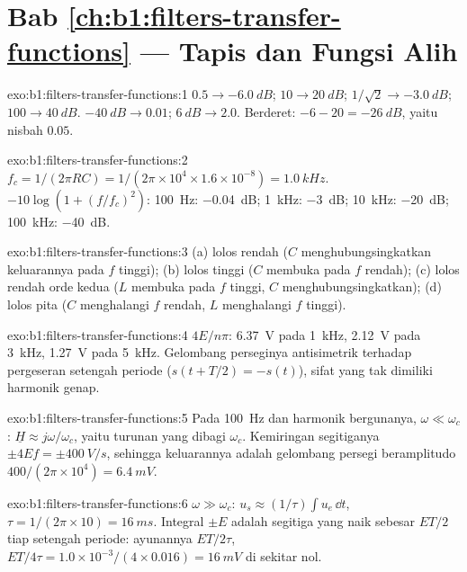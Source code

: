 \section*{Bab \ref{ch:b1:filters-transfer-functions} --- Tapis dan Fungsi Alih}

\begin{solution}{exo:b1:filters-transfer-functions:1}
$0.5 \to \qty{-6.0}{dB}$; $10 \to \qty{20}{dB}$; $1/\sqrt2 \to \qty{-3.0}{dB}$;
$100 \to \qty{40}{dB}$. $\qty{-40}{dB} \to 0.01$; $\qty{+6}{dB} \to 2.0$.
Berderet: $-6 - 20 = \qty{-26}{dB}$, yaitu nisbah $0.05$.
\end{solution}

\begin{solution}{exo:b1:filters-transfer-functions:2}
$f_c = 1/(2\pi RC) = 1/(2\pi \times 10^4 \times 1.6\times10^{-8}) =
\qty{1.0}{kHz}$.  $-10\log(1 + (f/f_c)^2)$: \qty{100}{Hz}:
\qty{-0.04}{dB}; \qty{1}{kHz}: \qty{-3}{dB}; \qty{10}{kHz}: \qty{-20}{dB};
\qty{100}{kHz}: \qty{-40}{dB}.
\end{solution}

\begin{solution}{exo:b1:filters-transfer-functions:3}
(a) lolos rendah ($C$ menghubungsingkatkan keluarannya pada $f$ tinggi);
(b) lolos tinggi ($C$ membuka pada $f$ rendah); (c) lolos rendah orde
kedua ($L$ membuka pada $f$ tinggi, $C$ menghubungsingkatkan); (d) lolos
pita ($C$ menghalangi $f$ rendah, $L$ menghalangi $f$ tinggi).
\end{solution}

\begin{solution}{exo:b1:filters-transfer-functions:4}
$4E/n\pi$: \qty{6.37}{V} pada \qty{1}{kHz}, \qty{2.12}{V} pada \qty{3}{kHz},
\qty{1.27}{V} pada \qty{5}{kHz}. Gelombang perseginya antisimetrik
terhadap pergeseran setengah periode ($s(t + T/2) = -s(t)$), sifat yang
tak dimiliki harmonik genap.
\end{solution}

\begin{solution}{exo:b1:filters-transfer-functions:5}
Pada \qty{100}{Hz} dan harmonik bergunanya, $\omega \ll \omega_c$:
$\underline H \approx j\omega/\omega_c$, yaitu turunan yang dibagi
$\omega_c$. Kemiringan segitiganya $\pm 4Ef = \pm\qty{400}{V/s}$, sehingga
keluarannya adalah gelombang persegi beramplitudo $400/(2\pi \times 10^4) =
\qty{6.4}{mV}$.
\end{solution}

\begin{solution}{exo:b1:filters-transfer-functions:6}
$\omega \gg \omega_c$: $u_s \approx (1/\tau)\int u_e\,\dd t$, $\tau =
1/(2\pi \times 10) = \qty{16}{ms}$. Integral $\pm E$ adalah segitiga
yang naik sebesar $ET/2$ tiap setengah periode: ayunannya $ET/2\tau$, 
$ET/4\tau = 1.0 \times 10^{-3}/(4 \times 0.016) = \qty{16}{mV}$ di sekitar
nol.
\end{solution}

